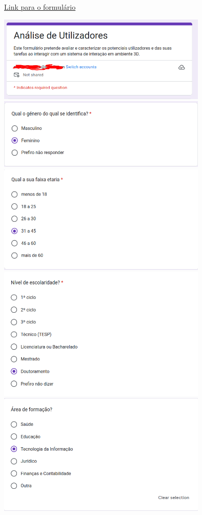 \documentclass[a4paper,12pt]{article}
\begin{document}
\begin{center}
    \href{https://forms.gle/mGgTZJcjzfStsLvn6}{Link para o formulário}

    \vspace{0.3cm}
    \includegraphics[width=0.75\textwidth]{form/intro_form.png}
    \includegraphics[width=0.75\textwidth]{form/01questao_genero.png}
    \includegraphics[width=0.75\textwidth]{form/02questao_idade.png}
    \includegraphics[width=0.75\textwidth]{form/03questao_escolaridade.png}
    \includegraphics[width=0.75\textwidth]{form/04questao_formacao.png}

\end{center}
\end{document}
